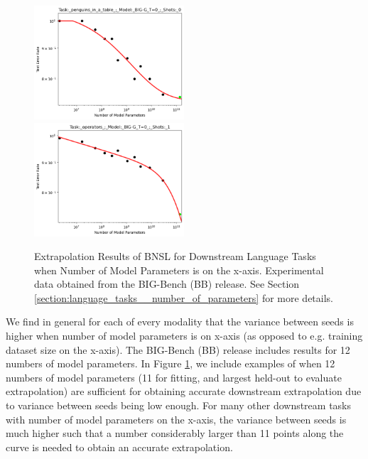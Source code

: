 \documentclass{article} %
\begin{document}
\begin{figure}[htbp]
    \centering
\includegraphics[width=0.497\textwidth]{figures/big_bench__parameter_scalling/penguins_in_a_table___BIG-G_T=0___0.png}
\includegraphics[width=0.497\textwidth]{figures/big_bench__parameter_scalling/operators___BIG-G_T=0___1.png}
    \caption{
Extrapolation Results of BNSL for Downstream Language Tasks when Number of Model Parameters is on the x-axis. Experimental data obtained from the BIG-Bench (BB) \citep{srivastava2022beyond} release.
See Section \ref{section:language_tasks__number_of_parameters} for more details.
    }
    \label{fig:language_tasks__number_of_parameters}
\end{figure}

We find in general for each of every modality that the variance between seeds is higher when number of model parameters is on x-axis (as opposed to e.g. training dataset size on the x-axis). The BIG-Bench (BB) \citep{srivastava2022beyond} release includes results for 12 numbers of model parameters. In Figure \ref{fig:language_tasks__number_of_parameters}, we include examples of when 12 numbers of model parameters (11 for fitting, and largest held-out to evaluate extrapolation)
are sufficient for obtaining accurate downstream extrapolation due to variance between seeds being low enough. For many other downstream tasks with number of model parameters on the x-axis, the variance between seeds is much higher such that a number considerably larger than 11 points along the curve is needed to obtain an accurate extrapolation.
\end{document}
